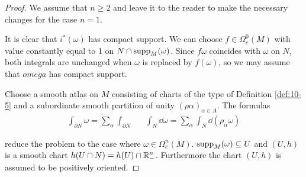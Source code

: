 \begin{proof}
  We assume that $n\ge 2$ and leave it to the reader to make the necessary
  changes for the case $n = 1$.

  It is clear that $i^*(\omega)$ has compact support. We can choose $f\in\Omega^0_c(M)$ with value
  constantly equal to 1 on $N\cap\operatorname{supp}_M(\omega)$. Since $f\omega$ coincides with $\omega$ on $N$, 
  both integrals are unchanged when $\omega$ is replaced by $f(\omega)$, so we may assume that $omega$
  has compact support.

  Choose a smooth atlas on $M$ consisting of charts of the type of Definition \ref{def:10-5}
  and a subordinate smooth partition of unity $(\rho\alpha)_{\alpha\in A}$. The formulas
  \begin{align*}
    \int_{\partial N}\omega = \sum_{\alpha} \int_{\partial N} 
    &&
    \int_N \dd\omega = \sum_{\alpha} \int_N \dd(\rho_\alpha\omega)
  \end{align*}

  reduce the problem to the case where $\omega\in\Omega^n_c(M)$. $\operatorname{supp}_M(\omega)\subseteq U$
  and $(U, h)$ is a smooth chart $h(U\cap N) = h(U)\cap\mathbb{R}^n_-$. Furthermore the chart $(U, h)$
  is assumed to be positively oriented.


\end{proof}
